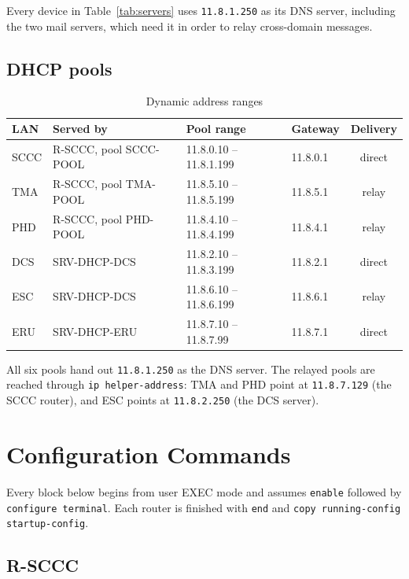 \documentclass[11pt,a4paper]{article}
\newcommand{\netc}[1]{\texttt{\small #1}}
\begin{document}
\noindent
Every device in Table~\ref{tab:servers} uses \netc{11.8.1.250} as its DNS
server, including the two mail servers, which need it in order to relay
cross-domain messages.

\subsection{DHCP pools}

\begin{table}[htbp]
\centering
\caption{Dynamic address ranges}
\label{tab:dhcp}
\small
\begin{tabular}{@{}llllc@{}}
\toprule
\textbf{LAN} & \textbf{Served by} & \textbf{Pool range} &
\textbf{Gateway} & \textbf{Delivery} \\
\midrule
SCCC & R-SCCC, pool SCCC-POOL & 11.8.0.10 -- 11.8.1.199 & 11.8.0.1 & direct \\
TMA  & R-SCCC, pool TMA-POOL  & 11.8.5.10 -- 11.8.5.199 & 11.8.5.1 & relay \\
PHD  & R-SCCC, pool PHD-POOL  & 11.8.4.10 -- 11.8.4.199 & 11.8.4.1 & relay \\
DCS  & SRV-DHCP-DCS           & 11.8.2.10 -- 11.8.3.199 & 11.8.2.1 & direct \\
ESC  & SRV-DHCP-DCS           & 11.8.6.10 -- 11.8.6.199 & 11.8.6.1 & relay \\
ERU  & SRV-DHCP-ERU           & 11.8.7.10 -- 11.8.7.99  & 11.8.7.1 & direct \\
\bottomrule
\end{tabular}
\end{table}

\noindent
All six pools hand out \netc{11.8.1.250} as the DNS server. The relayed pools
are reached through \netc{ip helper-address}: TMA and PHD point at
\netc{11.8.7.129} (the SCCC router), and ESC points at \netc{11.8.2.250}
(the DCS server).

\clearpage
\section{Configuration Commands}

Every block below begins from user EXEC mode and assumes \netc{enable}
followed by \netc{configure terminal}. Each router is finished with
\netc{end} and \netc{copy running-config startup-config}.

\subsection{R-SCCC}
\end{document}
